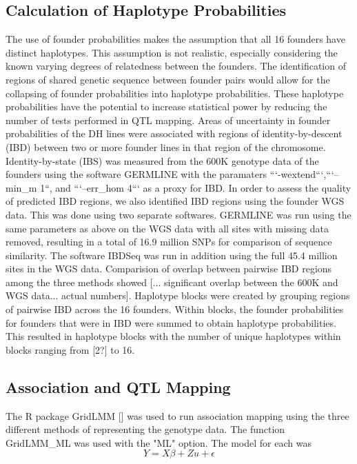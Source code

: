 \documentclass[article,9pt,twocolumn,twoside]{rilabRxiv}
\begin{document}
\subsection{Calculation of Haplotype Probabilities}
The use of founder probabilities makes the assumption that all 16 founders have
distinct haplotypes. This assumption is not realistic, especially considering the
known varying degrees of relatedness between the founders. The identification of
regions of shared genetic sequence between founder pairs would allow for the collapsing
of founder probabilities into haplotype probabilities. These haplotype probabilities
have the potential to increase statistical power by reducing the number of tests
performed in QTL mapping. Areas of uncertainty in founder probabilities of the
DH lines were associated with regions of identity-by-descent (IBD) between two or
 more founder lines in that region of the chromosome. Identity-by-state (IBS) was measured from the
600K genotype data of the founders using the software GERMLINE with the paramaters
```-wextend```,```--min\_m 1``, and ```--err\_hom 4``` as a proxy for IBD. In order
 to assess the quality of predicted IBD regions, we also identified IBD regions
 using the founder WGS data. This was done using two separate softwares. GERMLINE
 was run using the same parameters as above on the WGS data with all sites with
 missing data removed, resulting in a total of 16.9 million SNPs for comparison
 of sequence similarity. The software IBDSeq was run in addition using the full
 45.4 million sites in the WGS data. Comparision of overlap between pairwise IBD
 regions among the three methods showed [... significant overlap between the 600K
 and WGS data... actual numbers]. Haplotype blocks were created by grouping regions
  of pairwise IBD across the 16 founders. Within blocks, the founder probabilities
  for founders that were in  IBD were summed to obtain haplotype probabilities.
  This resulted in haplotype blocks with the number of unique haplotypes within
   blocks ranging from [2?] to 16.

\subsection{Association and QTL Mapping}
The R package GridLMM [] was used to run association mapping using the three
 different methods of representing the genotype data. The function GridLMM\_ML was
 used with the "ML" option. The model for each was
\begin{equation}
\label{eqn:gridlmm}
 Y = X\beta + Zu + \epsilon
\end{equation}
\end{document}
